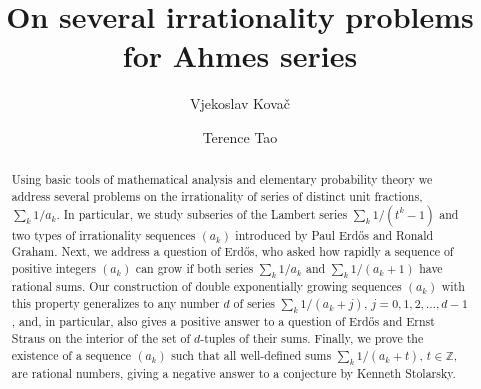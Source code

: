 \documentclass[11pt,letterpaper,reqno]{amsart}
\numberwithin{equation}{section}
\theoremstyle{definition}
\numberwithin{equation}{section}
\begin{document}
\title{On several irrationality problems for Ahmes series}

\author{Vjekoslav Kova\v{c}}
\address{V.K., Department of Mathematics, Faculty of Science, University of Zagreb, Bijeni\v{c}ka cesta 30, 10000 Zagreb, Croatia}

\author{Terence Tao}
\address{T.T., UCLA Department of Mathematics, Los Angeles, CA 90095-1555}




\begin{abstract}
Using basic tools of mathematical analysis and elementary probability theory we address several problems on the irrationality of series of distinct unit fractions, $\sum_k 1/a_k$. In particular, we study subseries of the Lambert series $\sum_k 1/(t^k-1)$ and two types of irrationality sequences $(a_k)$ introduced by Paul Erd\H{o}s and Ronald Graham.
Next, we address a question of Erd\H{o}s, who asked how rapidly a sequence of positive integers $(a_k)$ can grow if both series $\sum_k 1/a_k$ and $\sum_k 1/(a_k+1)$ have rational sums. Our construction of double exponentially growing sequences $(a_k)$ with this property generalizes to any number $d$ of series $\sum_k 1/(a_k+j)$, $j=0,1,2,\ldots,d-1$, and, in particular, also gives a positive answer to a question of Erd\H{o}s and Ernst Straus on the interior of the set of $d$-tuples of their sums.
Finally, we prove the existence of a sequence $(a_k)$ such that all well-defined sums $\sum_k 1/(a_k+t)$, $t\in\mathbb{Z}$, are rational numbers, giving a negative answer to a conjecture by Kenneth Stolarsky.
\end{abstract}

\maketitle

\tableofcontents

\end{document}
